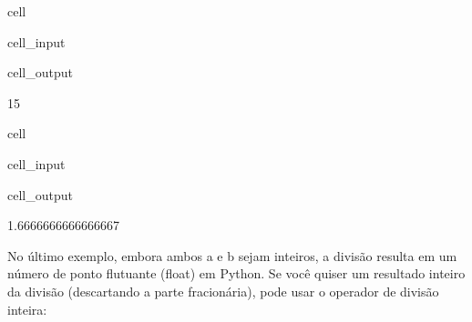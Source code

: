 \documentclass[letterpaper,10pt,english]{jupyterBook}
\begin{document}
\begin{sphinxuseclass}{cell}\begin{sphinxVerbatimInput}

\begin{sphinxuseclass}{cell_input}
\begin{sphinxVerbatim}[commandchars=\\\{\}]
      
\end{sphinxVerbatim}

\end{sphinxuseclass}\end{sphinxVerbatimInput}
\begin{sphinxVerbatimOutput}

\begin{sphinxuseclass}{cell_output}
\begin{sphinxVerbatim}[commandchars=\\\{\}]
\PYGZhy{}15
\end{sphinxVerbatim}

\end{sphinxuseclass}\end{sphinxVerbatimOutput}

\end{sphinxuseclass}
\begin{sphinxuseclass}{cell}\begin{sphinxVerbatimInput}

\begin{sphinxuseclass}{cell_input}
\begin{sphinxVerbatim}[commandchars=\\\{\}]
      
\end{sphinxVerbatim}

\end{sphinxuseclass}\end{sphinxVerbatimInput}
\begin{sphinxVerbatimOutput}

\begin{sphinxuseclass}{cell_output}
\begin{sphinxVerbatim}[commandchars=\\\{\}]
\PYGZhy{}1.6666666666666667
\end{sphinxVerbatim}

\end{sphinxuseclass}\end{sphinxVerbatimOutput}

\end{sphinxuseclass}
\sphinxAtStartPar
No último exemplo, embora ambos a e b sejam inteiros, a divisão resulta em um número de ponto flutuante (float) em Python. Se você quiser um resultado inteiro da divisão (descartando a parte fracionária), pode usar o operador de divisão inteira:
\end{document}
